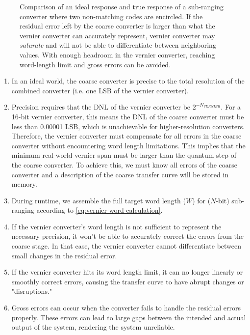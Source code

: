 \begin{figure}[htbp]
    \centering
    \caption[Sub-Ranging Converter Signal]{
        Comparison of an ideal response and true response of a
        sub-ranging converter where two non-matching codes are encircled.
        If the residual error left by the coarse converter is larger than what
        the vernier converter can accurately represent, vernier converter
        may \emph{saturate} and will not be able to differentiate between
        neighboring values.
	With enough headroom in the vernier converter, reaching word-length
        limit and gross errors can be avoided.
    }
    \label{fig:subranging-signal}
\end{figure}

\begin{enumerate}[topsep=8pt,itemsep=4pt,partopsep=4pt, parsep=4pt]
    \item
    In an ideal world, the coarse converter is precise to the total resolution
    of the combined converter (i.e. one \acs{LSB} of the vernier converter).

    \item
    Precision requires that the \ac{DNL} of the vernier converter be
    $2^{-N_{VERNIER}}$.
    For a 16-bit vernier converter, this means the \acs{DNL} of the coarse
    converter must be less than 0.00001 LSB, which is
    unachievable for higher-resolution converters.
    Therefore, the vernier converter must compensate for all errors in the
    coarse converter without encountering word length limitations.
    This implies that the minimum real-world vernier span must be larger than
    the quantum step of the coarse converter.
    To achieve this, we must know all errors of the coarse converter and a
    description of the coarse transfer curve will be stored in memory.

    \item
    During runtime, we assemble the full target word length ($W$) for ($N$-bit)
    sub-ranging according to \autoref{eq:vernier-word-calculation}.

    \item
    If the vernier converter's word length is not sufficient to represent the
    necessary precision, it won't be able to accurately correct the errors from
    the coarse stage. In that case, the vernier converter cannot
    differentiate between small changes in the residual error.

    \item
    If the vernier converter hits its word length limit, it can no longer
    linearly or smoothly correct errors, causing the transfer curve to have
    abrupt changes or "disruptions."

    \item
    Gross errors can occur when the converter fails to handle the residual
    errors properly.
    These errors can lead to large gaps between the intended and actual output
    of the system, rendering the system unreliable.

\end{enumerate}

